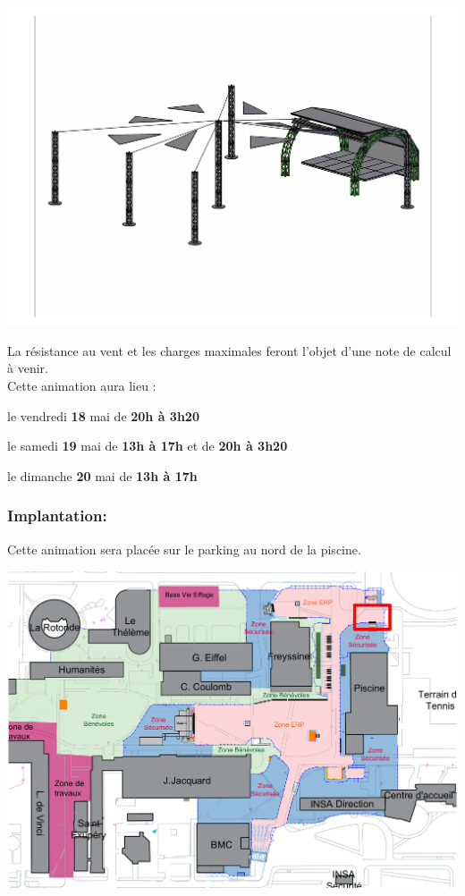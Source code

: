 \documentclass[hidelinks, paper=a4, fontsize=13pt]{report}
\begin{document}
\begin{center}
	\includegraphics[width=.8\textwidth,keepaspectratio]{Annexes/Images/Totems}
\end{center}

La résistance au vent et les charges maximales feront l'objet d'une note de calcul à venir.\\

Cette animation aura lieu :
\begin{list}{•}{}
	\item le vendredi \textbf{18} mai de \textbf{20h à 3h20}
	\item le samedi \textbf{19} mai de \textbf{13h à 17h} et de \textbf{20h à 3h20}
	\item le dimanche \textbf{20} mai de \textbf{13h à 17h}
\end{list}

\subsubsection{Implantation:}
Cette animation sera placée sur le parking au nord de la piscine.
\begin{center}
	\includegraphics[width=.8\textwidth,keepaspectratio]{Exports/Plan_24h_45eme-3e_Scene}
\end{center}
\end{document}
